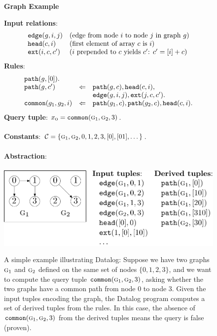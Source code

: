 \begin{figure}
\begin{center} {\bf Graph Example} \end{center}
{\bf Input relations}:
\[
\begin{array}{ll}
\text{\tt edge}(g,i,j) & \text{(edge from node $i$ to node $j$ in graph $g$)} \\
\text{\tt head}(c,i)   & \text{(first element of array $c$ is $i$)} \\
\text{\tt ext}(i,c,c') & \text{($i$ prepended to $c$ yields $c'$: $c' = [i]+c$)} \\
\end{array}
\]
{\bf Rules}:
\[
\begin{array}{lcl}
\text{\tt path}(g,[0]). & \\
\text{\tt path}(g,c')           &\Leftarrow& \text{\tt path}(g,c), \text{\tt head}(c,i), \\
                      &           & \text{\tt edge}(g, i, j), \text{\tt ext}(j, c, c'). \\
\text{\tt common}(g_1,g_2,i)    &\Leftarrow& \text{\tt path}(g_1,c), \text{\tt path}(g_2,c), \text{\tt head}(c,i). \\
\end{array}
\]
{\bf Query tuple}: $x_\text{\sc o} = \text{\tt common}(\text{\sc g}_1,\text{\sc g}_2,3)$. \\
\\
{\bf Constants}: $\mathcal{C} = \{ \text{\sc g}_1, \text{\sc g}_2, 0, 1, 2, 3, [0], [01], \dots \}$.
\\
\\
{\bf Abstraction}:
\\
\\
\includegraphics[scale=0.5]{figures/graphExample}
\caption{\label{fig:graphExample}
A simple example illustrating Datalog:
Suppose we have two graphs $\text{\sc g}_1$ and $\text{\sc g}_2$ defined on the same set of nodes $\{0,1,2,3\}$,
and we want to compute the query tuple $\text{\tt common}(\text{\sc g}_1,\text{\sc g}_2,3)$,
asking whether the two graphs have a common path from node $0$ to node $3$.
Given the input tuples encoding the graph,
the Datalog program computes a set of derived tuples from the rules.
In this case, the absence of $\text{\tt common}(\text{\sc g}_1,\text{\sc g}_2,3)$ from the derived tuples means the query is false (proven).
}
\end{figure}


